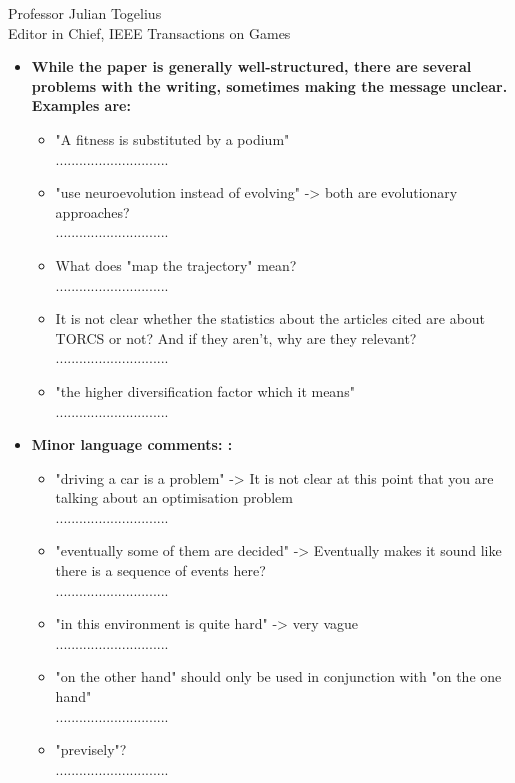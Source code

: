 \documentclass[10pt]{letter} %
\begin{document}
\begin{letter}{Professor Julian Togelius \\ Editor in Chief, IEEE Transactions on Games}
\begin{enumerate}
\begin{itemize}
		\item {\bf 	While the paper is generally well-structured, there are several problems with the writing, sometimes making the message unclear. Examples are:}
			\begin{itemize}
			\item "A fitness is substituted by a podium"\\
.............................
			\item "use neuroevolution instead of evolving" -> both are evolutionary approaches?\\
.............................
			\item What does "map the trajectory" mean?\\
.............................
			\item It is not clear whether the statistics about the articles cited are about TORCS or not? And if they aren't, why are they relevant?\\
.............................
			\item "the higher diversification factor which it means"\\
.............................
			\end{itemize}
	

	\item {\bf Minor language comments: :} 
				\begin{itemize}
				\item 	"driving a car is a problem" -> It is not clear at this point that you are talking about an optimisation problem\\
.............................
				\item 	"eventually some of them are decided" -> Eventually makes it sound like there is a sequence of events here?\\
.............................
	

				\item 	"in this environment is quite hard" -> very vague\\
.............................

				\item 	"on the other hand" should only be used in conjunction with "on the one hand"\\
.............................
				\item 	"previsely"?\\
.............................
			
			\end{itemize}
	

\end{itemize}
\end{enumerate}
\end{letter}
\end{document}
